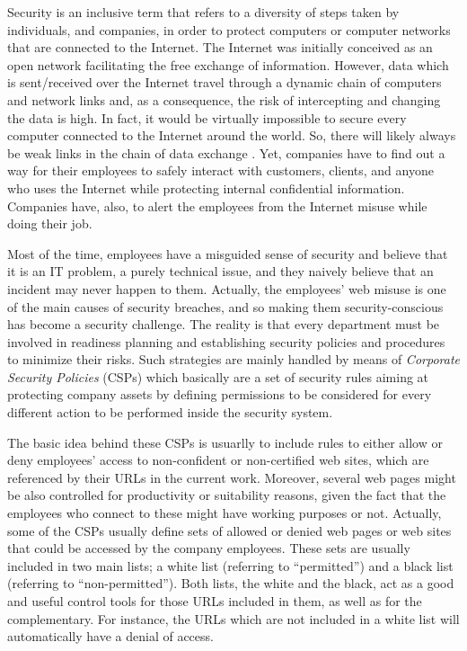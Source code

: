 \documentclass{llncs}
\begin{document}
\noindent Security is an inclusive term that refers to a diversity of
steps taken by individuals, and companies, in order to protect
computers or computer networks that are connected to the Internet. The
Internet was initially conceived as an open network facilitating the
free exchange of information. However, data which is sent/received
over the Internet travel through a dynamic chain of computers and
network links and, as a consequence, the risk of intercepting and changing
the data is high. In fact, it would be virtually impossible to secure
every computer connected to the Internet around the world. So, there
will likely always be weak links in the chain of data exchange
\cite{cheswick2003firewalls}. Yet, companies have to find out a way
for their employees to
safely interact with customers, clients, and anyone who uses the
Internet while protecting internal confidential information. Companies
have, also, to alert the employees from the Internet misuse while
doing their job. 
 
Most of the time, employees have a misguided sense of security and
believe that it is an IT problem, a purely technical issue, and they
naively believe that an incident may never happen to them. %
 Actually, the employees' web misuse is one of the main causes of
 security breaches, %
 and so making them security-conscious has become a security
 challenge. The reality is that every department must be involved in
 readiness planning and establishing security policies and procedures
 to minimize their risks. Such strategies are mainly handled by means
 of \textit{Corporate Security Policies} (CSPs) which basically are a
 set of security rules aiming at protecting company assets by defining
 permissions to be considered for every different action to be
 performed inside the security system. %
 
The basic idea behind these CSPs is usuarlly to include rules to
either allow or deny employees' access to non-confident or
non-certified web sites, which are referenced by their URLs in the
current work. %
 Moreover, several web pages might be also controlled for productivity
 or suitability reasons, given the fact that the employees who connect
 to these might have working purposes or not. Actually, some of the
 CSPs usually define sets of allowed or denied web pages or web sites
 that could be accessed by the company employees. These sets are
 usually included in two main lists; a white list (referring to
 ``permitted'') and a black list (referring to
 ``non-permitted''). Both lists, the white and the black, act as a
 good and useful control tools for those URLs included in them, as
 well as for the complementary. For instance, the URLs which are not
 included in a white list will automatically have a denial of
 access. %
\end{document}
